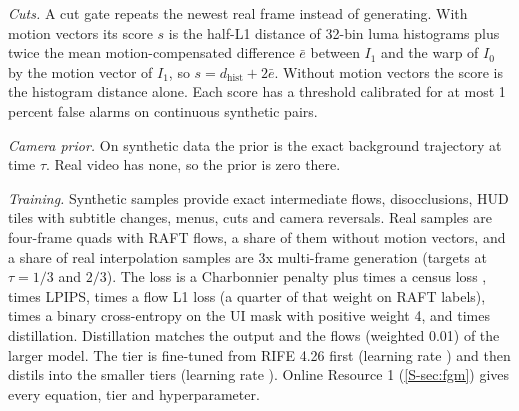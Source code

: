 \documentclass[pdflatex,sn-mathphys-num,iicol]{sn-jnl}
\begin{document}
\emph{Cuts.} A cut gate repeats the newest real frame instead of generating. With motion vectors its score $s$ is the half-L1 distance of 32-bin luma histograms plus twice the mean motion-compensated difference $\bar{e}$ between $I_1$ and the warp of $I_0$ by the motion vector of $I_1$, so $s=d_{\mathrm{hist}}+2\bar{e}$. Without motion vectors the score is the histogram distance alone. Each score has a threshold calibrated for at most 1 percent false alarms on continuous synthetic pairs.

\emph{Camera prior.} On synthetic data the prior is the exact background trajectory at time $\tau$. Real video has none, so the prior is zero there.

\emph{Training.} Synthetic samples provide exact intermediate flows, disocclusions, HUD tiles with subtitle changes, menus, cuts and camera reversals. Real samples are four-frame quads with RAFT flows, a share  of them without motion vectors, and a share  of real interpolation samples are 3x multi-frame generation (targets at $\tau=1/3$ and $2/3$). The loss is a Charbonnier penalty plus  times a census loss \cite{meister2018unflow},  times LPIPS,  times a flow L1 loss (a quarter of that weight on RAFT labels),  times a binary cross-entropy on the UI mask with positive weight 4, and  times distillation. Distillation matches the output and the flows (weighted 0.01) of the larger model. The  tier is fine-tuned from RIFE 4.26 first (learning rate ) and then distils into the smaller tiers (learning rate ). Online Resource 1 (\cref{S-sec:fgm}) gives every equation, tier and hyperparameter.
\end{document}

